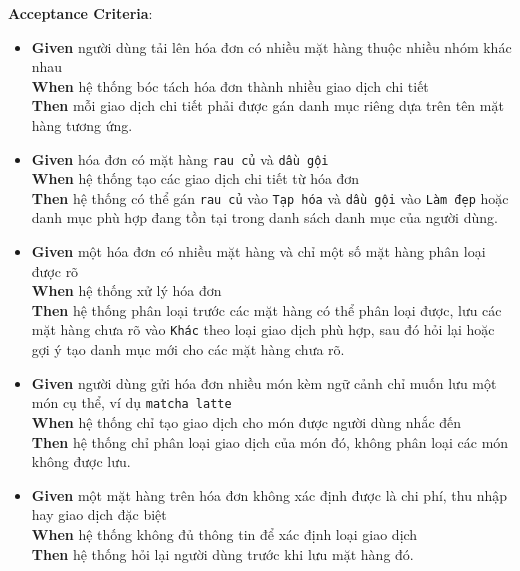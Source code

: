 \textbf{Acceptance Criteria}:

\begin{itemize}
\item \textbf{Given} người dùng tải lên hóa đơn có nhiều mặt hàng thuộc nhiều nhóm khác nhau  \\ \hspace*{1.5em}  \textbf{When} hệ thống bóc tách hóa đơn thành nhiều giao dịch chi tiết  \\ \hspace*{1.5em}  \textbf{Then} mỗi giao dịch chi tiết phải được gán danh mục riêng dựa trên tên mặt hàng tương ứng.
\item \textbf{Given} hóa đơn có mặt hàng \texttt{rau củ} và \texttt{dầu gội}  \\ \hspace*{1.5em}  \textbf{When} hệ thống tạo các giao dịch chi tiết từ hóa đơn  \\ \hspace*{1.5em}  \textbf{Then} hệ thống có thể gán \texttt{rau củ} vào \texttt{Tạp hóa} và \texttt{dầu gội} vào \texttt{Làm đẹp} hoặc danh mục phù hợp đang tồn tại trong danh sách danh mục của người dùng.
\item \textbf{Given} một hóa đơn có nhiều mặt hàng và chỉ một số mặt hàng phân loại được rõ  \\ \hspace*{1.5em}  \textbf{When} hệ thống xử lý hóa đơn  \\ \hspace*{1.5em}  \textbf{Then} hệ thống phân loại trước các mặt hàng có thể phân loại được, lưu các mặt hàng chưa rõ vào \texttt{Khác} theo loại giao dịch phù hợp, sau đó hỏi lại hoặc gợi ý tạo danh mục mới cho các mặt hàng chưa rõ.
\item \textbf{Given} người dùng gửi hóa đơn nhiều món kèm ngữ cảnh chỉ muốn lưu một món cụ thể, ví dụ \texttt{matcha latte}  \\ \hspace*{1.5em}  \textbf{When} hệ thống chỉ tạo giao dịch cho món được người dùng nhắc đến  \\ \hspace*{1.5em}  \textbf{Then} hệ thống chỉ phân loại giao dịch của món đó, không phân loại các món không được lưu.
\item \textbf{Given} một mặt hàng trên hóa đơn không xác định được là chi phí, thu nhập hay giao dịch đặc biệt  \\ \hspace*{1.5em}  \textbf{When} hệ thống không đủ thông tin để xác định loại giao dịch  \\ \hspace*{1.5em}  \textbf{Then} hệ thống hỏi lại người dùng trước khi lưu mặt hàng đó.
\end{itemize}
